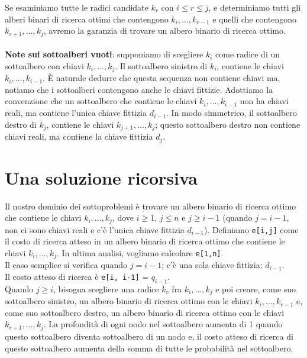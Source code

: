 Se esaminiamo tutte le radici candidate $k_r$ con $i \le r \le j$, e
determiniamo tutti gli alberi binari di ricerca ottimi che contengono
$k_i, ..., k_{r-1}$ e quelli che contengono $k_{r+1}, ..., k_{j}$,
avremo la garanzia di trovare un albero binario di ricerca ottimo.
\\ \\
\textbf{Note sui sottoalberi vuoti}: supponiamo di scegliere $k_i$
come radice di un sottoalbero con chiavi $k_i, ..., k_j$. Il
sottoalbero sinistro di $k_i$, contiene le chiavi
$k_i, ..., k_{i-1}$. È naturale dedurre che questa sequenza non
contiene chiavi ma, notiamo che i sottoalberi contengono anche le chiavi
fittizie. Adottiamo la convenzione che un sottoalbero che contiene le
chiavi $k_i, ..., k_{i-1}$ non ha chiavi reali, ma contiene l'unica
chiave fittizia $d_{i-1}$. In modo simmetrico, il sottoalbero destro
di $k_j$, contiene le chiavi $k_{j+1}, ..., k_j$; questo sottoalbero
destro non contiene chiavi reali, ma contiene la chiave fittizia
$d_j$.


\section{Una soluzione ricorsiva}

Il nostro dominio dei sottoproblemi è trovare un albero binario di
ricerca ottimo che contiene le chiavi $k_i, ..., k_j$, dove
$i \ge 1$, $j \le n$ e $j \ge i-1$ (quando $j = i-1$, non ci
sono chiavi reali e c'è l'unica chiave fittizia $d_{i-1}$). Definiamo
\texttt{e{[}i,j{]}} come il costo di ricerca atteso in un albero binario
di ricerca ottimo che contiene le chiavi $k_i, ..., k_j$. In ultima
analisi, vogliamo calcolare \texttt{e{[}1,n{]}}.\\

Il caso semplice si verifica quando $j = i-1$; c'è una sola chiave
fittizia: $d_{i-1}$.\\

Il costo atteso di ricerca è \texttt{e{[}i,\ i-1{]}} = $q_{i-1}$.\\

Quando $j \ge i$, bisogna scegliere una radice $k_r$ fra
$k_i, ..., k_j$ e poi creare, come suo sottoalbero sinistro, un albero
binario di ricerca ottimo con le chiavi $k_i, ..., k_{r-1}$ e, come
suo sottoalbero destro, un albero binario di ricerca ottimo con le
chiavi $k_{r+1}, ..., k_j$. La profondità di ogni nodo nel sottoalbero
aumenta di 1 quando questo sottoalbero diventa sottoalbero di un nodo e,
il costo atteso di ricerca di questo sottoalbero aumenta della somma di
tutte le probabilità nel sottoalbero.\\

